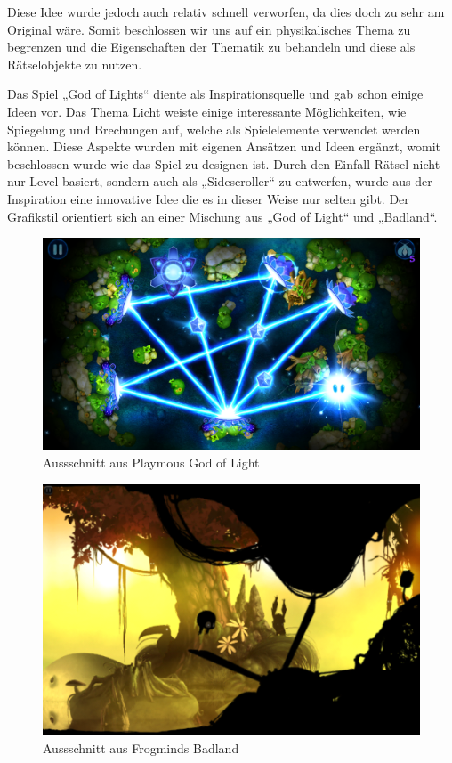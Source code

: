 Diese Idee wurde jedoch auch relativ schnell verworfen, da dies doch zu sehr am Original wäre. Somit beschlossen wir uns auf ein physikalisches Thema zu begrenzen und die Eigenschaften der Thematik zu behandeln und diese als Rätselobjekte zu nutzen. 

Das Spiel „God of Lights“ diente als Inspirationsquelle und gab schon einige Ideen vor. Das Thema Licht weiste einige interessante Möglichkeiten, wie Spiegelung und Brechungen auf, welche als Spielelemente verwendet werden können. Diese Aspekte wurden mit eigenen Ansätzen und Ideen ergänzt, womit beschlossen wurde wie das Spiel zu designen ist.
Durch den Einfall Rätsel nicht nur Level basiert, sondern auch als „Sidescroller“ zu entwerfen, wurde aus der Inspiration eine innovative Idee die es in dieser Weise nur selten gibt. Der Grafikstil orientiert sich an einer Mischung aus „God of Light“ und „Badland“.

\begin{figure}[H]
    \centering
    \includegraphics[scale=0.15, center]{res/gol.jpg}
    \caption[Aussschnitt aus Playmous God of Light]{Aussschnitt aus Playmous God of Light\footnotemark}
    \label{gol}
\end{figure}

\begin{figure}[H]
    \centering
    \includegraphics[scale=0.3, center]{res/badland.jpg}
    \caption[Aussschnitt aus Frogminds Badland]{Aussschnitt aus Frogminds Badland\footnotemark}
    \label{bad}
\end{figure}


